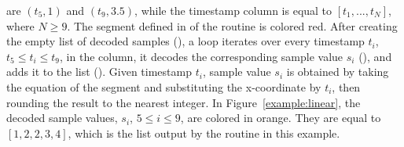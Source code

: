 \vspace{-12pt}
\begin{table}[h]
\begin{minipage}{0.45\textwidth}
are $(t_5,1)$ and $(t_9,3.5)$, while the timestamp column is equal to $[t_1,...,t_N]$, where $N \geq 9$. The segment defined in  of the routine is colored red. After creating the empty list of decoded samples (), a loop iterates over every timestamp $t_i$, $t_5 \leq t_i \leq t_9$, in the column, it decodes the corresponding sample value $s_i$ (), and adds it to the list (). Given timestamp $t_i$, sample value $s_i$ is obtained by taking the equation of the segment and substituting the x-coordinate by $t_i$, then rounding the result to the nearest integer. In Figure~\ref{example:linear}, the decoded sample values, $s_i$, $5 \leq i \leq 9$, are colored in orange. They are equal to $[1, 2, 2, 3, 4]$, which is the list output by the routine \decodeSegment in this example.
\end{minipage}
\hspace{0.02\textwidth}
\begin{minipage}{0.49\textwidth}
\examplelinear
\end{minipage}
\end{table}


